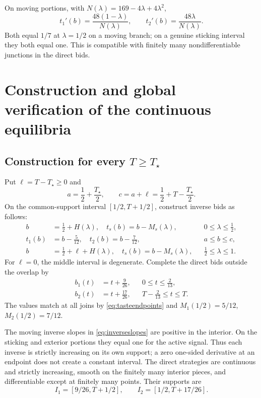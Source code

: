 \documentclass[11pt,a4paper]{article}
\numberwithin{equation}{section}
\theoremstyle{definition}
\theoremstyle{remark}
\newcommand{\Ts}{T_\star}
\begin{document}
On moving portions, with $N(\lambda)=169-4\lambda+4\lambda^2$,
\begin{equation}
\label{eq:inverseslopes}
 t_1'(b)=\frac{48(1-\lambda)}{N(\lambda)},\qquad
 t_2'(b)=\frac{48\lambda}{N(\lambda)}.
\end{equation}
Both equal $1/7$ at $\lambda=1/2$ on a moving branch; on a genuine sticking interval they both equal one. This is compatible with finitely many nondifferentiable junctions in the direct bids.

\section{Construction and global verification of the continuous equilibria}
\label{sec:continuousconstruction}

\subsection{Construction for every \texorpdfstring{$T\ge\Ts$}{T at least Tstar}}
Put $\ell=T-\Ts\ge0$ and
\[
 a=\frac12+\frac{\Ts}{2},\qquad
 c=a+\ell=\frac12+T-\frac{\Ts}{2}.
\]
On the common-support interval $[1/2,T+1/2]$, construct inverse bids as follows:
\begin{align}
 b&=\frac12+H(\lambda),\quad
 t_s(b)=b-M_s(\lambda),
 &&0\le\lambda\le\tfrac12,\label{eq:constructlower}\\
 t_1(b)&=b-\frac5{12},\quad
 t_2(b)=b-\frac7{12},
 &&a\le b\le c,\label{eq:constructstick}\\
 b&=\frac12+\ell+H(\lambda),\quad
 t_s(b)=b-M_s(\lambda),
 &&\tfrac12\le\lambda\le1.\label{eq:constructupper}
\end{align}
For $\ell=0$, the middle interval is degenerate. Complete the direct bids outside the overlap by
\begin{align}
 b_1(t)&=t+\frac9{26},&&0\le t\le\frac2{13},\label{eq:lowerexterior}\\
 b_2(t)&=t+\frac{17}{26},&&T-\frac2{13}\le t\le T.\label{eq:upperexterior}
\end{align}
The values match at all joins by \eqref{eq:tasteendpoints} and $M_1(1/2)=5/12$, $M_2(1/2)=7/12$.

The moving inverse slopes in \eqref{eq:inverseslopes} are positive in the interior. On the sticking and exterior portions they equal one for the active signal. Thus each inverse is strictly increasing on its own support; a zero one-sided derivative at an endpoint does not create a constant interval. The direct strategies are continuous and strictly increasing, smooth on the finitely many interior pieces, and differentiable except at finitely many points. Their supports are
\begin{equation}
\label{eq:overlapsupports}
 I_1=[9/26,T+1/2],\qquad I_2=[1/2,T+17/26].
\end{equation}
\end{document}
